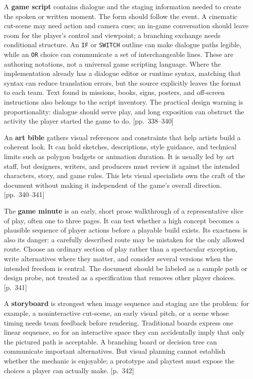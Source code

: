 A \textbf{game script} contains dialogue and the staging information needed to create the spoken or written moment. The form should follow the event. A cinematic cut-scene may need action and camera cues; an in-game conversation should leave room for the player's control and viewpoint; a branching exchange needs conditional structure. An \texttt{IF} or \texttt{SWITCH} outline can make dialogue paths legible, while an \texttt{OR} choice can communicate a set of interchangeable lines. These are authoring notations, not a universal game scripting language. Where the implementation already has a dialogue editor or runtime syntax, matching that syntax can reduce translation errors, but the source explicitly leaves the format to each team. Text found in missions, books, signs, posters, and off-screen instructions also belongs to the script inventory. The practical design warning is proportionality: dialogue should serve play, and long exposition can obstruct the activity the player started the game to do. {[}pp.~338--340{]}

An \textbf{art bible} gathers visual references and constraints that help artists build a coherent look. It can hold sketches, descriptions, style guidance, and technical limits such as polygon budgets or animation duration. It is usually led by art staff, but designers, writers, and producers must review it against the intended characters, story, and game rules. This lets visual specialists own the craft of the document without making it independent of the game's overall direction. {[}pp.~340--341{]}

The \textbf{game minute} is an early, short prose walkthrough of a representative slice of play, often one to three pages. It can test whether a high concept becomes a plausible sequence of player actions before a playable build exists. Its exactness is also its danger: a carefully described route may be mistaken for the only allowed route. Choose an ordinary section of play rather than a spectacular exception, write alternatives where they matter, and consider several versions when the intended freedom is central. The document should be labeled as a sample path or design probe, not treated as a specification that removes other player choices. {[}p.~341{]}

A \textbf{storyboard} is strongest when image sequence and staging are the problem: for example, a noninteractive cut-scene, an early visual pitch, or a scene whose timing needs team feedback before rendering. Traditional boards express one linear sequence, so for an interactive space they can accidentally imply that only the pictured path is acceptable. A branching board or decision tree can communicate important alternatives. But visual planning cannot establish whether the mechanic is enjoyable; a prototype and playtest must expose the choices a player can actually make. {[}p.~342{]}

